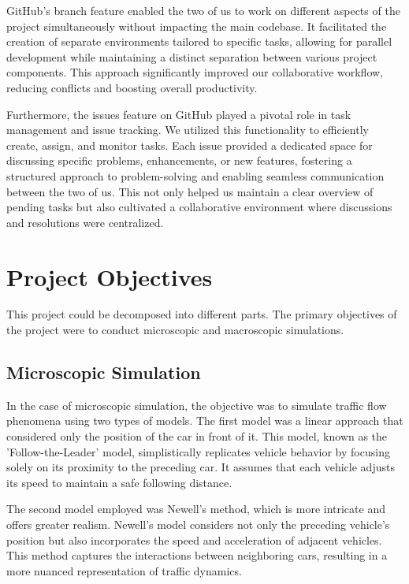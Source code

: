 \documentclass{article}
\begin{document}
	GitHub's branch feature enabled the two of us to work on different aspects of the project simultaneously without impacting the main codebase. It facilitated the creation of separate environments tailored to specific tasks, allowing for parallel development while maintaining a distinct separation between various project components. This approach significantly improved our collaborative workflow, reducing conflicts and boosting overall productivity.
	
	Furthermore, the issues feature on GitHub played a pivotal role in task management and issue tracking. We utilized this functionality to efficiently create, assign, and monitor tasks. Each issue provided a dedicated space for discussing specific problems, enhancements, or new features, fostering a structured approach to problem-solving and enabling seamless communication between the two of us. This not only helped us maintain a clear overview of pending tasks but also cultivated a collaborative environment where discussions and resolutions were centralized.
	
	\section{Project Objectives}
	
	This project could be decomposed into different parts. The primary objectives of the project were to conduct microscopic and macroscopic simulations.
	
	\subsection{Microscopic Simulation}
	
	
	In the case of microscopic simulation, the objective was to simulate traffic flow phenomena using two types of models.
	The first model was a linear approach that considered only the position of the car in front of it. This model, known as the 'Follow-the-Leader' model, simplistically replicates vehicle behavior by focusing solely on its proximity to the preceding car. It assumes that each vehicle adjusts its speed to maintain a safe following distance.
	
	The second model employed was Newell's method, which is more intricate and offers greater realism. Newell's model considers not only the preceding vehicle's position but also incorporates the speed and acceleration of adjacent vehicles. This method captures the interactions between neighboring cars, resulting in a more nuanced representation of traffic dynamics.
	
\end{document}
